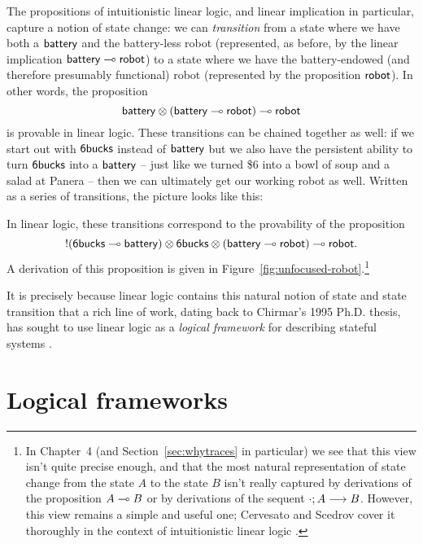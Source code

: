 The propositions of intuitionistic linear logic, and linear implication
in particular, capture a notion of state change: we can {\it
  transition} from a state where we have both a ${\sf battery}$ and
the battery-less robot (represented, as before, by the linear
implication ${\sf battery} \multimap {\sf robot}$) to a state where we
have the battery-endowed (and therefore presumably functional) robot
(represented by the proposition ${\sf robot}$). In other words, the
proposition
%
\[{\sf battery} \otimes ({\sf battery} \multimap {\sf robot}) \multimap
{\sf robot}\] 
%
is provable in linear logic. These transitions can be chained
together as well: if we start out with ${\sf
  6bucks}$ instead of ${\sf battery}$ but we also have the
persistent ability to turn ${\sf 6bucks}$ into a ${\sf battery}$ --
just like we turned \$6 into a bowl of soup and a salad at Panera --
then we can ultimately get our working robot as well.
Written as a series of transitions, the picture looks like this:

In linear logic, these transitions correspond to the provability
of the proposition
\[{!}({\sf 6bucks} \multimap {\sf battery}) \otimes {\sf 6bucks} \otimes
({\sf battery} \multimap {\sf robot}) \multimap {\sf robot}.\] A derivation
of this proposition is given in
Figure~\ref{fig:unfocused-robot}.\footnote{In Chapter~4 (and
  Section~\ref{sec:whytraces} in particular) we see that this view
  isn't quite precise enough, and that the most natural representation
  of state change from the state $A$ to the state $B$ isn't really
  captured by derivations of the proposition $A \multimap B$ or by
  derivations of the sequent ${\cdot};{A} \longrightarrow {B} \mathstrut$.  However, this view
  remains a simple and useful one; Cervesato and Scedrov cover it
  thoroughly in the context of intuitionistic linear logic
  \cite{cervesato09relating}.}



It is precisely because linear logic contains this natural notion of
state and state transition that a rich line of work, dating back to
Chirmar's 1995 Ph.D. thesis, has sought to use linear logic as a {\it
  logical framework} for describing stateful systems
\cite{chirimar95proof,cervesato02linear,
  cervesato02concurrent,pfenning04substructural,miller09formalizing,
  pfenning09substructural,cervesato09relating}.  

\section{Logical frameworks}
\label{sec:linlogicalframeworks}


